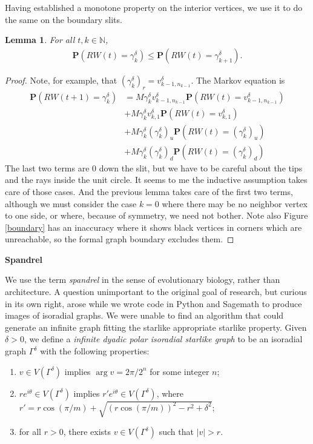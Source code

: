 \documentclass[]{amsart}
\newtheorem{lem}[thm]{Lemma}
\numberwithin{equation}{section}
\begin{document}
Having established a monotone property on the interior vertices, we use it to do the same on the boundary slits.


\begin{lem} \label{lem_slit}
For all $t, k \in \mathbb{N}$, 
\begin{align}
\mathbf{P}(RW(t) = \gamma_k^{\delta}) \le \mathbf{P}(RW(t) = \gamma_{k+1}^{\delta}).
\end{align}
\end{lem}
\begin{proof}
Note, for example, that $(\gamma_k^{\delta})_r = v^{\delta}_{k-1,n_{k-1}}$.
The Markov equation is 
\begin{align}
\mathbf{P}(RW(t+1) =  \gamma_k^{\delta}) &= M \gamma_k^{\delta}v^{\delta}_{k-1,n_{k-1}} \mathbf{P}(RW(t) =v^{\delta}_{k-1,n_{k-1}}) \\
&+ M \gamma_k^{\delta}v^{\delta}_{k,1} \mathbf{P}(RW(t) = v^{\delta}_{k,1}) \\
&+ M \gamma_k^{\delta}(\gamma_k^{\delta})_u\mathbf{P}(RW(t) = (\gamma_k^{\delta})_u) \\
&+ M \gamma_k^{\delta}(\gamma_k^{\delta})_d\mathbf{P}(RW(t) = (\gamma_k^{\delta})_d) 
\end{align}
The last two terms are 0 down the slit, but we have to be careful about the tips and the rays inside the unit circle.  It seems to me the inductive assumption takes care of those cases.  And the previous lemma takes care of the first two terms, although we must consider the case $k=0$ where there may be no neighbor vertex to one side, or where, because of symmetry, we need not bother.  Note also Figure \ref{boundary} has an inaccuracy where it shows black vertices in corners which are unreachable, so the formal graph boundary excludes them.
\end{proof}


\textbf{Spandrel}

We use the term \textit{spandrel} in the sense of evolutionary biology, rather than architecture.  A question unimportant to the original goal of research, but curious in its own right, arose while we wrote code in Python and Sagemath to produce images of isoradial graphs.  We were unable to find an algorithm that could generate an infinite graph fitting the starlike appropriate starlike property.  Given $\delta > 0$, we define a \textit{infinite dyadic polar isoradial starlike graph} to be an isoradial graph $\varGamma^{\delta}$ with the following properties:

\begin{enumerate}
\item [(Dyadic)] $v \in V(\varGamma^{\delta})$ implies $\arg v = 2\pi  / 2^n$ for some integer $n$;
\item [(Starlike)] $re^{i\theta} \in V(\varGamma^{\delta})$ implies $r' e^{i\theta} \in V(\varGamma^{\delta})$, where $r' = r \cos(\pi/m) + \sqrt{(r \cos(\pi/m))^2 - r^2 + \delta^2}$;
\item [(Infinite)] for all $r > 0$, there exists $v \in V(\varGamma^{\delta})$ such that $|v| > r$.
\end{enumerate}
\end{document}
